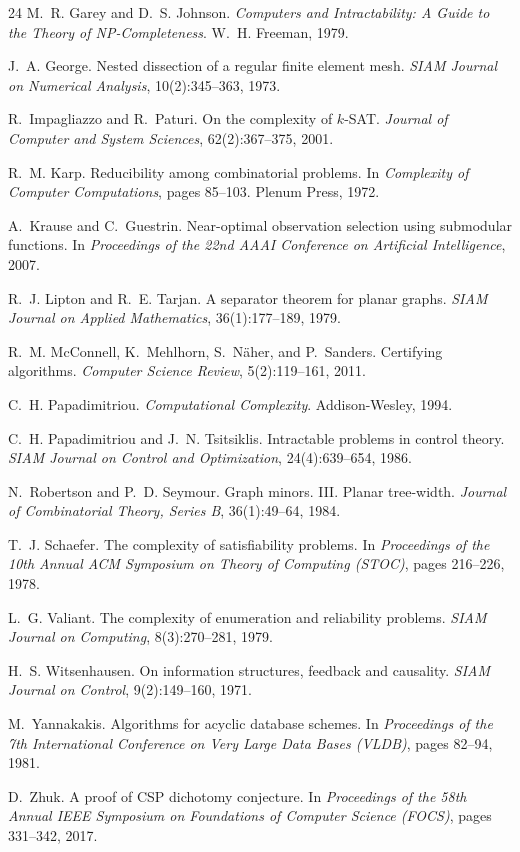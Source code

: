 \documentclass[11pt]{article}
\theoremstyle{plain}
\theoremstyle{definition}
\theoremstyle{remark}
\begin{document}
\begin{thebibliography}{24}
 M.~R. Garey and D.~S. Johnson.
\emph{Computers and Intractability: A Guide to the Theory of
NP-Completeness}. W.~H. Freeman, 1979.

 J.~A. George. Nested dissection of a regular finite
element mesh. \emph{SIAM Journal on Numerical Analysis}, 10(2):345--363,
1973.

 R.~Impagliazzo and R.~Paturi.
On the complexity of $k$-SAT. \emph{Journal of Computer and System
Sciences}, 62(2):367--375, 2001.

 R.~M. Karp. Reducibility among combinatorial problems.
In \emph{Complexity of Computer Computations}, pages 85--103. Plenum Press,
1972.

 A.~Krause and C.~Guestrin. Near-optimal
observation selection using submodular functions. In \emph{Proceedings of
the 22nd AAAI Conference on Artificial Intelligence}, 2007.

 R.~J. Lipton and R.~E. Tarjan. A separator theorem
for planar graphs. \emph{SIAM Journal on Applied Mathematics},
36(1):177--189, 1979.

 R.~M. McConnell, K.~Mehlhorn, S.~N\"aher, and P.~Sanders.
Certifying algorithms. \emph{Computer Science Review}, 5(2):119--161, 2011.

 C.~H. Papadimitriou. \emph{Computational
Complexity}. Addison-Wesley, 1994.

 C.~H. Papadimitriou and J.~N. Tsitsiklis.
Intractable problems in control theory. \emph{SIAM Journal on Control and
Optimization}, 24(4):639--654, 1986.

 N.~Robertson and P.~D. Seymour.
Graph minors. III. Planar tree-width. \emph{Journal of Combinatorial Theory,
Series B}, 36(1):49--64, 1984.

 T.~J. Schaefer. The complexity of satisfiability
problems. In \emph{Proceedings of the 10th Annual ACM Symposium on Theory of
Computing (STOC)}, pages 216--226, 1978.

 L.~G. Valiant. The complexity of enumeration and
reliability problems. \emph{SIAM Journal on Computing}, 8(3):270--281, 1979.

 H.~S. Witsenhausen. On information structures,
feedback and causality. \emph{SIAM Journal on Control}, 9(2):149--160, 1971.

 M.~Yannakakis. Algorithms for acyclic database
schemes. In \emph{Proceedings of the 7th International Conference on Very
Large Data Bases (VLDB)}, pages 82--94, 1981.

 D.~Zhuk. A proof of CSP dichotomy conjecture. In
\emph{Proceedings of the 58th Annual IEEE Symposium on Foundations of
Computer Science (FOCS)}, pages 331--342, 2017.

\end{thebibliography}
\end{document}
